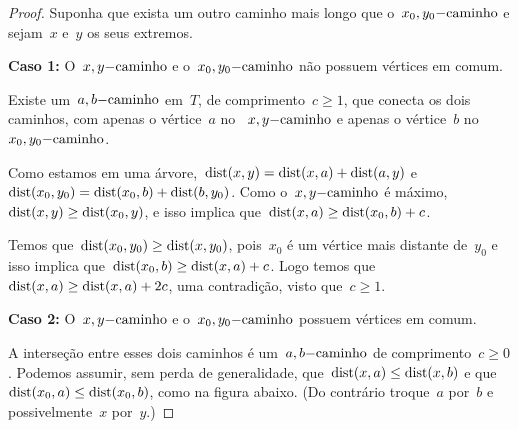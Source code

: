 	\begin{proof}
		Suponha que exista um outro caminho mais longo que 
		o~$x_0,y_0\mathrm{-caminho}$ e sejam~$x$ e~$y$ os seus extremos.

	        \textbf{Caso 1:} O~$x,y\mathrm{-caminho}$ e 
	        o~$x_0,y_0\mathrm{-caminho}$ não possuem vértices em comum.

	        Existe um~$a,b\mathrm{-caminho}$ em~$T$, de 
	        comprimento~$c \ge 1$, que conecta os dois caminhos, 
	        com apenas o vértice~$a$ 
	        no ~$x,y\mathrm{-caminho}$ e apenas o vértice~$b$ 
	        no~$x_0,y_0\mathrm{-caminho}$.

	        \begin{center}  \end{center}


	        Como estamos em uma 
	        árvore,~${\mathrm{dist}(x,y) =\mathrm{dist}(x,a)+\mathrm{dist}(a,y)}$
	        e~${\mathrm{dist}(x_0,y_0) =\mathrm{dist}(x_0,b)+\mathrm{dist}(b,y_0)}$.
	        Como o~$x,y\mathrm{-caminho}$ é 
	        máximo,~${\mathrm{dist}(x,y)\ge \mathrm{dist}(x_0,y)}$,
	        e isso implica que~${\mathrm{dist}(x,a)\ge \mathrm{dist}(x_0,b)+c}$.
 			
 			Temos que~${\mathrm{dist}(x_0,y_0)\ge \mathrm{dist}(x,y_0)}$,
	        pois~$x_0$ é um vértice mais distante de~$y_0$ e isso implica 
	        que~${\mathrm{dist}(x_0,b)\ge \mathrm{dist}(x,a)+c}$.
	        Logo temos 
	        que~${\mathrm{dist}(x,a)\ge \mathrm{dist}(x, a)+2c}$,
	        uma contradição, visto que~${c\ge 1}$.


			\bigskip
			\bigskip
			\bigskip


			\textbf{Caso 2:} O~$x,y\mathrm{-caminho}$ e 
			o~$x_0,y_0\mathrm{-caminho}$ possuem vértices em comum.

			A interseção entre esses dois caminhos é 
			um~$a,b\mathrm{-caminho}$ de comprimento~$c \ge 0$.
			Podemos assumir, sem perda de generalidade, 
			que~${\mathrm{dist}(x,a) \le \mathrm{dist}(x,b)}$ e 
			que~${\mathrm{dist}(x_0,a) \le \mathrm{dist}(x_0,b)}$, como na figura 
			abaixo.
			(Do contrário troque~$a$ por~$b$ e possivelmente~$x$
			por~$y$.)


\end{proof}
